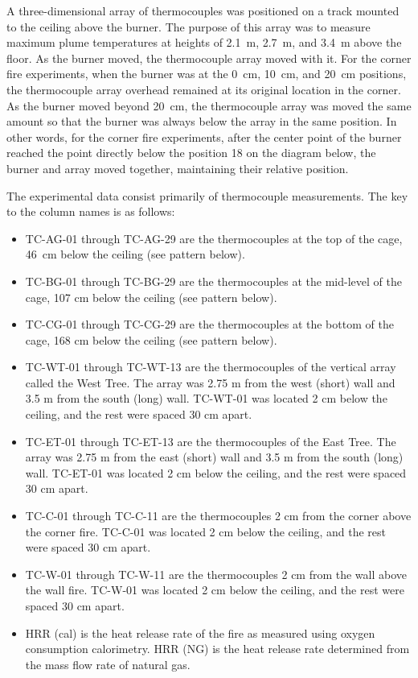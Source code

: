 A three-dimensional array of thermocouples was positioned on a track mounted to the ceiling above the burner. The purpose of this array was to measure maximum plume temperatures at heights of 2.1~m, 2.7~m, and 3.4~m above the floor. As the burner moved, the thermocouple array moved with it. For the corner fire experiments, when the burner was at the 0~cm, 10~cm, and 20~cm positions, the thermocouple array overhead remained at its original location in the corner. As the burner moved beyond 20~cm, the thermocouple array was moved the same amount so that the burner was always below the array in the same position. In other words, for the corner fire experiments, after the center point of the burner reached the point directly below the position 18 on the diagram below, the burner and array moved together, maintaining their relative position.

The experimental data consist primarily of thermocouple measurements. The key to the column names is as follows:
\begin{itemize}
\item TC-AG-01 through TC-AG-29 are the thermocouples at the top of the cage, 46~cm below the ceiling (see pattern below).
\item TC-BG-01 through TC-BG-29 are the thermocouples at the mid-level of the cage, 107 cm below the ceiling (see pattern below).
\item TC-CG-01 through TC-CG-29 are the thermocouples at the bottom of the cage, 168 cm below the ceiling (see pattern below).
\item TC-WT-01 through TC-WT-13 are the thermocouples of the vertical array called the West Tree. The array was 2.75 m from the west (short) wall and 3.5 m from the south (long) wall. TC-WT-01 was located 2 cm below the ceiling, and the rest were spaced 30 cm apart.
\item TC-ET-01 through TC-ET-13 are the thermocouples of the East Tree. The array was 2.75 m from the east (short) wall and 3.5 m from the south (long) wall. TC-ET-01 was located 2 cm below the ceiling, and the rest were spaced 30 cm apart.
\item TC-C-01 through TC-C-11 are the thermocouples 2 cm from the corner above the corner fire. TC-C-01 was located 2 cm below the ceiling, and the rest were spaced 30 cm apart.
\item TC-W-01 through TC-W-11 are the thermocouples 2 cm from the wall above the wall fire. TC-W-01 was located 2 cm below the ceiling, and the rest were spaced 30 cm apart.
\item HRR (cal) is the heat release rate of the fire as measured using oxygen consumption calorimetry. HRR (NG) is the heat release rate determined from the mass flow rate of natural gas.
\end{itemize}

